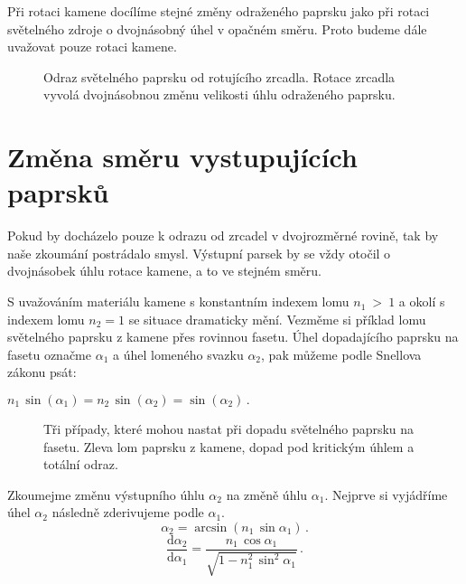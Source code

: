 Při rotaci kamene docílíme stejné změny odraženého paprsku jako při rotaci světelného zdroje o dvojnásobný úhel v opačném směru. Proto budeme dále uvažovat pouze rotaci kamene. 


\begin{figure}[h!]
\begin{center}
\scalebox{1}{ }
\end{center}
\caption[Odraz světelného paprsku od rotujícího zrcadla.]{Odraz světelného paprsku od rotujícího zrcadla. Rotace zrcadla vyvolá dvojnásobnou změnu velikosti úhlu odraženého paprsku.}
\label{fig:odraz zrcadlo}
\end{figure}

\section{Změna směru vystupujících paprsků}
\label{sec: zmena smeru}
Pokud by docházelo pouze k odrazu od zrcadel v dvojrozměrné rovině, tak by naše zkoumání postrádalo smysl. Výstupní parsek by se vždy otočil o dvojnásobek úhlu rotace kamene, a to ve stejném směru. 

S uvažováním materiálu kamene s konstantním indexem lomu $ n_1~>~1 $ a okolí s indexem lomu $ n_2 = 1 $ se situace dramaticky mění. Vezměme si příklad lomu světelného paprsku z kamene přes rovinnou fasetu. Úhel dopadajícího paprsku na fasetu označme $\alpha_1$ a úhel lomeného svazku $\alpha_2$, pak můžeme podle Snellova zákonu psát:

\begin{center}
$n_1\,\sin(\alpha_1) = n_2\,\sin(\alpha_2) = \sin(\alpha_2)\,.$
\end{center}

\begin{figure}[h!]
\begin{center}
\scalebox{.9}{ }
\end{center}
\caption[Kritický úhel a totální odraz.]{Tři případy, které mohou nastat při dopadu světelného paprsku na fasetu. Zleva lom paprsku z kamene, dopad pod kritickým úhlem a totální odraz.}
\label{fig:lom ven }
\end{figure}

Zkoumejme změnu výstupního úhlu $\alpha_2$ na změně úhlu $\alpha_1$. Nejprve si vyjádříme úhel $\alpha_2$ následně zderivujeme podle $\alpha_1$. 
\begin{equation}
\alpha_2 = \arcsin(n_1\,\sin\alpha_1)\,.
\label{eq:derivace uhlu1}  
\end{equation}
\begin{equation} \frac{\mathrm{d}\alpha_2}{\mathrm{d}\alpha_1}= \frac{n_1\,\cos\alpha_1}{\sqrt{1-n_1^2\,\sin^2\alpha_1}}\,.
\label{eq:derivace uhlu}  
\end{equation}

